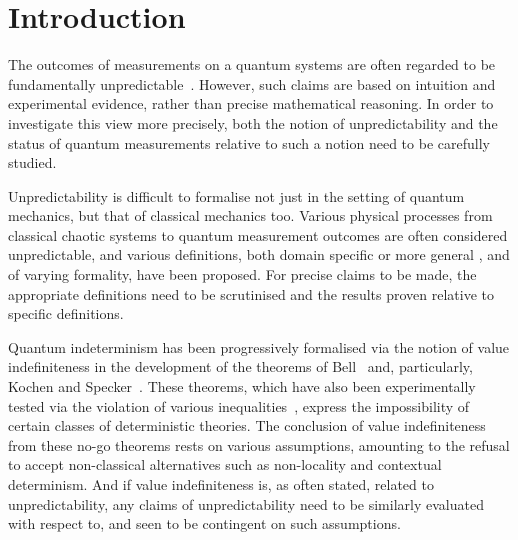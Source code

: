 \documentclass[%
 superscriptaddress,
 preprint,
 showpacs,
 showkeys,
 preprintnumbers,
 nofootinbib,
  amsmath,amssymb,
  aps,
 pra,
  longbibliography,
  floatfix,
 ]{revtex4-1}
\theoremstyle{definition}
\begin{document}
\pacs{}

\maketitle


\section{Introduction}

The outcomes of measurements on a quantum systems are often regarded to be fundamentally unpredictable~\cite{zeil-05_nature_ofQuantum}.
However, such claims are based on intuition and experimental evidence, rather than precise mathematical reasoning.
In order to investigate this view more precisely, both the notion of unpredictability and the status of quantum measurements relative to such a notion need to be carefully studied.

Unpredictability is difficult to formalise not just in the setting of quantum mechanics, but that of classical mechanics too.
Various physical processes from classical chaotic systems to quantum measurement outcomes are often considered unpredictable, and various definitions, both domain specific \cite{Werndl:2009nx} or more general \cite{Eagle:2005ys}, and of varying formality, have been proposed.
For precise claims to be made, the appropriate definitions need to be scrutinised and the results proven relative to specific definitions.

Quantum indeterminism has been progressively formalised via the notion of value indefiniteness in the development of the theorems of Bell~\cite{bell-66} and, particularly,  Kochen and Specker~\cite{kochen1}.
These theorems, which have also been experimentally tested via the violation of various inequalities~\cite{wjswz-98}, express the impossibility of certain classes of deterministic theories.
The conclusion of value indefiniteness from these no-go theorems rests on various assumptions, amounting to the refusal to accept non-classical alternatives such as non-locality and contextual determinism.
And if value indefiniteness is, as often stated, related to unpredictability, any claims of unpredictability need to be similarly evaluated with respect to, and seen to be contingent on such assumptions.
\end{document}
